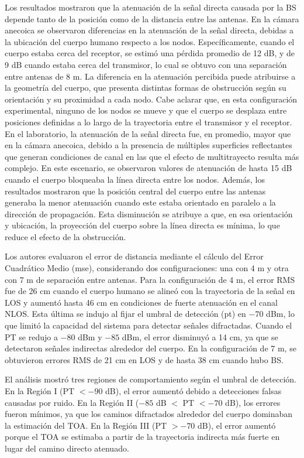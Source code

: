 \begin{enumerate}
    Los resultados mostraron que la atenuación de la señal directa causada por la BS depende tanto de la posición como de la distancia entre las antenas. En la cámara anecoica se observaron diferencias en la atenuación de la señal directa, debidas a la ubicación del cuerpo humano respecto a los nodos. Específicamente, cuando el cuerpo estaba cerca del receptor, se estimó una pérdida promedio de 12 dB, y de 9 dB cuando estaba cerca del transmisor, lo cual se obtuvo con una separación entre antenas de 8 m. La diferencia en la atenuación percibida puede atribuirse a la geometría del cuerpo, que presenta distintas formas de obstrucción según su orientación y su proximidad a cada nodo. Cabe aclarar que, en esta configuración experimental, ninguno de los nodos se mueve y que el cuerpo se desplaza entre posiciones definidas a lo largo de la trayectoria entre el transmisor y el receptor. En el laboratorio, la atenuación de la señal directa fue, en promedio, mayor que en la cámara anecoica, debido a la presencia de múltiples superficies reflectantes que generan condiciones de canal en las que el efecto de multitrayecto resulta más complejo. En este escenario, se observaron valores de atenuación de hasta 15 dB cuando el cuerpo bloqueaba la línea directa entre los nodos. Además, los resultados mostraron que la posición central del cuerpo entre las antenas generaba la menor atenuación cuando este estaba orientado en paralelo a la dirección de propagación. Esta disminución se atribuye a que, en esa orientación y ubicación, la proyección del cuerpo sobre la línea directa es mínima, lo que reduce el efecto de la obstrucción.

    Los autores evaluaron el error de distancia mediante el cálculo del Error Cuadrático Medio (\gls{mse}), considerando dos configuraciones: una con 4 m y otra con 7 m de separación entre antenas. Para la configuración de 4 m, el error RMS fue de 26 cm cuando el cuerpo humano se alineó con la trayectoria de la señal en LOS y aumentó hasta 46 cm en condiciones de fuerte atenuación en el canal NLOS. Esta última se indujo al fijar el umbral de detección (\gls{pt}) en $-70$ dBm, lo que limitó la capacidad del sistema para detectar señales difractadas. Cuando el PT se redujo a $-80$ dBm y $-85$ dBm, el error disminuyó  a 14 cm, ya que se detectaron señales indirectas alrededor del cuerpo. En la configuración de 7 m, se obtuvieron errores RMS de 21 cm en LOS y de hasta 38 cm cuando hubo BS.

    El análisis mostró tres regiones de comportamiento según el umbral de detección. En la Región I (PT $< -90$ dB), el error aumentó debido a detecciones falsas causadas por ruido. En la Región II ($-85$ dB $< $ PT $< -70$ dB), los errores fueron mínimos, ya que los caminos difractados alrededor del cuerpo dominaban la estimación del TOA. En la Región III (PT $> -70$ dB), el error aumentó porque el TOA se estimaba a partir de la trayectoria indirecta más fuerte en lugar del camino directo atenuado.


\end{enumerate}
